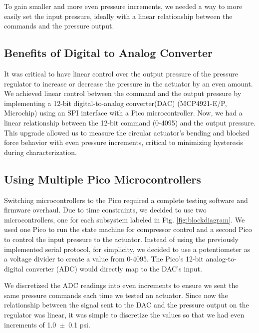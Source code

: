 To gain smaller and more even pressure increments, we needed a way to more easily set the input pressure, ideally with a linear relationship between the commands and the pressure output. 

\subsection{Benefits of Digital to Analog Converter}

It was critical to have linear control over the output pressure of the pressure regulator to increase or decrease the pressure in the actuator by an even amount. We achieved linear control between the command and the output pressure by implementing a 12-bit digital-to-analog converter(DAC) (MCP4921-E/P, Microchip) using an SPI interface with a Pico microcontroller. Now, we had a linear relationship between the 12-bit command (0-4095) and the output pressure. This upgrade allowed us to measure the circular actuator's bending and blocked force behavior with even pressure increments, critical to minimizing hysteresis during characterization. 

\subsection{Using Multiple Pico Microcontrollers}

Switching microcontrollers to the Pico required a complete testing software and firmware overhaul. Due to time constraints, we decided to use two microcontrollers, one for each subsystem labeled in Fig. \ref{fig:blockdiagram}. We used one Pico to run the state machine for compressor control and a second Pico to control the input pressure to the actuator. Instead of using the previously implemented serial protocol, for simplicity, we decided to use a potentiometer as a voltage divider to create a value from 0-4095. The Pico's 12-bit analog-to-digital converter (ADC) would directly map to the DAC's input. 

We discretized the ADC readings into even increments to ensure we sent the same pressure commands each time we tested an actuator. Since now the relationship between the signal sent to the DAC and the pressure output on the regulator was linear, it was simple to discretize the values so that we had even increments of 1.0~$\pm$~0.1 psi. 
